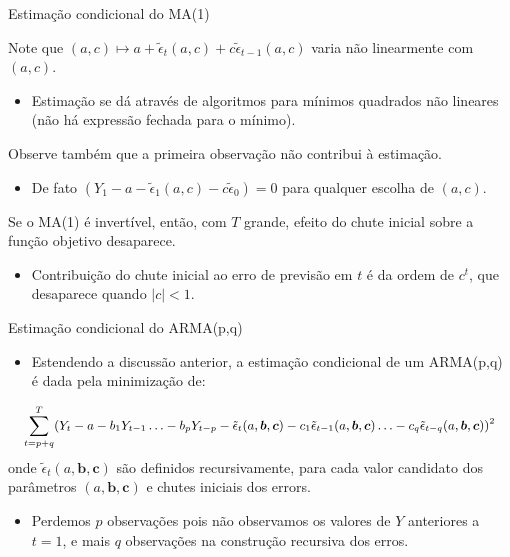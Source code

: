 \documentclass[11pt]{beamer}
\newenvironment{halfwideitemize}{\itemize\addtolength{\itemsep}{0.5em}}{\enditemize}
\begin{document}
\begin{frame}{Estimação condicional do MA(1)}
	\begin{halfwideitemize}
\item Note que $(a,c)\mapsto a+ \tilde{\epsilon}_t(a,c) + c\tilde{\epsilon}_{t-1}(a,c)$ varia não linearmente com $(a,c)$.
\begin{itemize}
	\item Estimação se dá através de algoritmos para mínimos quadrados não lineares (não há  expressão fechada para o mínimo).
\end{itemize}
\item Observe também que a primeira observação não contribui à estimação.
\begin{itemize}
	\item De fato $(Y_{1} -a - \tilde{\epsilon}_{1}(a,c) - c\tilde{\epsilon}_{0}) = 0$ para qualquer escolha de $(a,c)$.
\end{itemize}
\item Se o MA(1) é {\color{blue}invertível}, então, com $T$ grande, efeito do chute inicial sobre a função objetivo desaparece.
\begin{itemize}
	\item Contribuição do chute inicial ao erro de previsão em $t$ é da ordem de $c^t$, que desaparece quando $|c| < 1$. 
\end{itemize}
	\end{halfwideitemize}
\end{frame}

\begin{frame}{Estimação condicional do ARMA(p,q)}
	\begin{itemize}
		\item Estendendo a discussão anterior, a estimação condicional de um ARMA(p,q) é dada pela minimização de:
\end{itemize}
		\begin{equation*}
			\small  \sum_{t= p+q}^{T}(Y_t - a - b_1 Y_{t-1}  \ldots - b_p Y_{t-p} - \tilde{\epsilon}_t(a,\boldsymbol{b},\boldsymbol{c}) - c_1\tilde{\epsilon}_{t-1}(a,\boldsymbol{b},\boldsymbol{c}) \ldots -c_q \tilde{\epsilon}_{t-q}(a,\boldsymbol{b},\boldsymbol{c})  )^2
\end{equation*}
onde $\tilde{\epsilon}_t(a,\boldsymbol{b},\boldsymbol{c})$ são definidos recursivamente, para cada valor candidato dos parâmetros $(a,\boldsymbol{b},\boldsymbol{c})$ e chutes iniciais dos errors.
\begin{itemize}
	\item Perdemos $p$ observações pois não observamos os valores de $Y$ anteriores a $t=1$, e mais $q$ observações na construção recursiva dos erros.
\end{itemize}
\end{frame}
\end{document}
